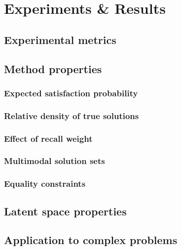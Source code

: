 \documentclass[../main.tex]{subfiles}
\begin{document}
\chapter{Experiments \& Results}

\section{Experimental metrics}

\section{Method properties}
\subsection{Expected satisfaction probability}
\subsection{Relative density of true solutions}
\subsection{Effect of recall weight}
\subsection{Multimodal solution sets}
\subsection{Equality constraints}

\section{Latent space properties}

\section{Application to complex problems}
\end{document}
